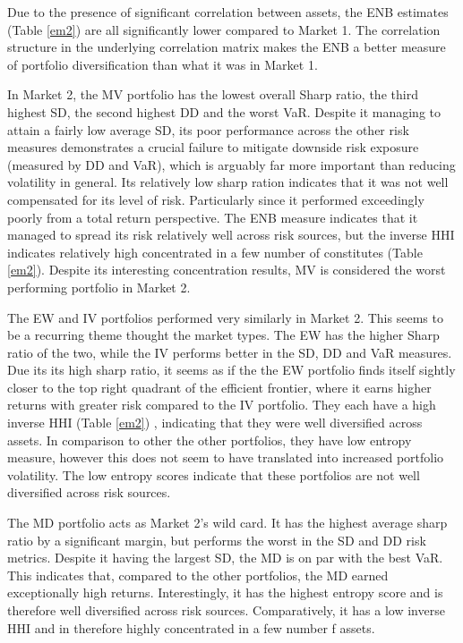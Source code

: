 \documentclass[11pt,preprint, authoryear]{elsarticle}
\numberwithin{equation}{section}
\numberwithin{figure}{section}
\numberwithin{table}{section}
\begin{document}
Due to the presence of significant correlation between assets, the ENB
estimates (Table \ref{em2}) are all significantly lower compared to
Market 1. The correlation structure in the underlying correlation matrix
makes the ENB a better measure of portfolio diversification than what it
was in Market 1.

In Market 2, the MV portfolio has the lowest overall Sharp ratio, the
third highest SD, the second highest DD and the worst VaR. Despite it
managing to attain a fairly low average SD, its poor performance across
the other risk measures demonstrates a crucial failure to mitigate
downside risk exposure (measured by DD and VaR), which is arguably far
more important than reducing volatility in general. Its relatively low
sharp ration indicates that it was not well compensated for its level of
risk. Particularly since it performed exceedingly poorly from a total
return perspective. The ENB measure indicates that it managed to spread
its risk relatively well across risk sources, but the inverse HHI
indicates relatively high concentrated in a few number of constitutes
(Table \ref{em2}). Despite its interesting concentration results, MV is
considered the worst performing portfolio in Market 2.

The EW and IV portfolios performed very similarly in Market 2. This
seems to be a recurring theme thought the market types. The EW has the
higher Sharp ratio of the two, while the IV performs better in the SD,
DD and VaR measures. Due its its high sharp ratio, it seems as if the
the EW portfolio finds itself sightly closer to the top right quadrant
of the efficient frontier, where it earns higher returns with greater
risk compared to the IV portfolio. They each have a high inverse HHI
(Table \ref{em2}) , indicating that they were well diversified across
assets. In comparison to other the other portfolios, they have low
entropy measure, however this does not seem to have translated into
increased portfolio volatility. The low entropy scores indicate that
these portfolios are not well diversified across risk sources.

The MD portfolio acts as Market 2's wild card. It has the highest
average sharp ratio by a significant margin, but performs the worst in
the SD and DD risk metrics. Despite it having the largest SD, the MD is
on par with the best VaR. This indicates that, compared to the other
portfolios, the MD earned exceptionally high returns. Interestingly, it
has the highest entropy score and is therefore well diversified across
risk sources. Comparatively, it has a low inverse HHI and in therefore
highly concentrated in a few number f assets.
\end{document}
